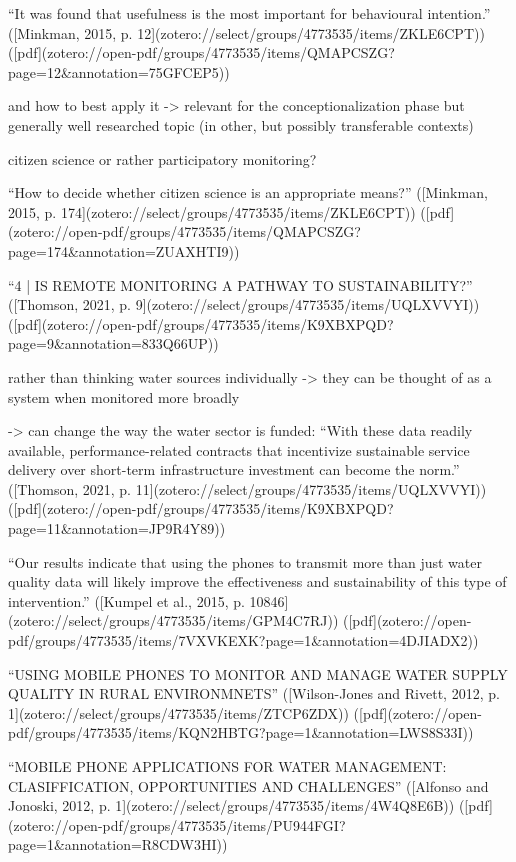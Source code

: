 {“It was found that usefulness is the most important for behavioural intention.” ([Minkman, 2015, p. 12](zotero://select/groups/4773535/items/ZKLE6CPT)) ([pdf](zotero://open-pdf/groups/4773535/items/QMAPCSZG?page=12&annotation=75GFCEP5))

and how to best apply it -> relevant for the conceptionalization phase but generally well researched topic (in other, but possibly transferable contexts)

citizen science or rather participatory monitoring?

“How to decide whether citizen science is an appropriate means?” ([Minkman, 2015, p. 174](zotero://select/groups/4773535/items/ZKLE6CPT)) ([pdf](zotero://open-pdf/groups/4773535/items/QMAPCSZG?page=174&annotation=ZUAXHTI9))

“4 | IS REMOTE MONITORING A PATHWAY TO SUSTAINABILITY?” ([Thomson, 2021, p. 9](zotero://select/groups/4773535/items/UQLXVVYI)) ([pdf](zotero://open-pdf/groups/4773535/items/K9XBXPQD?page=9&annotation=833Q66UP))

rather than thinking water sources individually -> they can be thought of as a system when monitored more broadly

-> can change the way the water sector is funded: “With these data readily available, performance-related contracts that incentivize sustainable service delivery over short-term infrastructure investment can become the norm.” ([Thomson, 2021, p. 11](zotero://select/groups/4773535/items/UQLXVVYI)) ([pdf](zotero://open-pdf/groups/4773535/items/K9XBXPQD?page=11&annotation=JP9R4Y89))

“Our results indicate that using the phones to transmit more than just water quality data will likely improve the effectiveness and sustainability of this type of intervention.” ([Kumpel et al., 2015, p. 10846](zotero://select/groups/4773535/items/GPM4C7RJ)) ([pdf](zotero://open-pdf/groups/4773535/items/7VXVKEXK?page=1&annotation=4DJIADX2))

“USING MOBILE PHONES TO MONITOR AND MANAGE WATER SUPPLY QUALITY IN RURAL ENVIRONMNETS” ([Wilson-Jones and Rivett, 2012, p. 1](zotero://select/groups/4773535/items/ZTCP6ZDX)) ([pdf](zotero://open-pdf/groups/4773535/items/KQN2HBTG?page=1&annotation=LWS8S33I))

“MOBILE PHONE APPLICATIONS FOR WATER MANAGEMENT: CLASIFFICATION, OPPORTUNITIES AND CHALLENGES” ([Alfonso and Jonoski, 2012, p. 1](zotero://select/groups/4773535/items/4W4Q8E6B)) ([pdf](zotero://open-pdf/groups/4773535/items/PU944FGI?page=1&annotation=R8CDW3HI))

}

